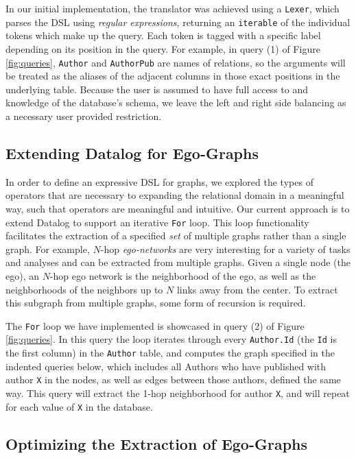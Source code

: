 \documentclass[11pt,letterpaper]{article}
\begin{document}
In our initial implementation, the translator was achieved using a \texttt{Lexer}, which parses the DSL using \textit{regular expressions}, returning an \texttt{iterable} of the individual tokens which make up the query. Each token is tagged with a specific label depending on its position in the query. For example, in query (1) of Figure \ref{fig:queries}, \texttt{Author} and \texttt{AuthorPub} are names of relations, so the arguments will be treated as the aliases of the adjacent columns in those exact positions in the underlying table. Because the user is assumed to have full access to and knowledge of the database's schema, we leave the left and right side balancing as a necessary user provided restriction.

\subsection*{Extending Datalog for Ego-Graphs}

In order to define an expressive DSL for graphs, we explored the types of operators that are necessary to expanding the relational domain in a meaningful way, such that operators are meaningful and intuitive. Our current approach is to extend Datalog to support an iterative \texttt{For} loop. This loop functionality facilitates the extraction of a specified \textit{set} of multiple graphs rather than a single graph. For example, $N$-hop \textit{ego-networks} are very interesting for a variety of tasks and analyses and can be extracted from multiple graphs. Given a single node (the ego), an $N$-hop ego network is the neighborhood of the ego, as well as the neighborhoods of the neighbors up to $N$ links away from the center. To extract this subgraph from multiple graphs, some form of recursion is required.

The \texttt{For} loop we have implemented is showcased in query (2) of Figure \ref{fig:queries}. In this query the loop iterates through every \texttt{Author.Id} (the \texttt{Id} is the first column) in the \texttt{Author} table, and computes the graph specified in the indented queries below, which includes all Authors who have published with author \texttt{X} in the nodes, as well as edges between those authors, defined the same way. This query will extract the 1-hop neighborhood for author \texttt{X}, and will repeat for each value of \texttt{X} in the database.

\subsection*{Optimizing the Extraction of Ego-Graphs}
\end{document}

